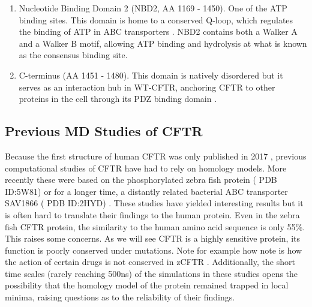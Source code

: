 \begin{enumerate}
	\item Nucleotide Binding Domain 2 (NBD2, AA 1169 - 1450). One of the ATP binding sites. This domain is home to a conserved Q-loop, which regulates the binding of ATP in ABC transporters \cite{ivey2020, zolnerciks2014, dong2015}. NBD2 contains both a Walker A and a Walker B motif, allowing ATP binding and hydrolysis at what is known as the consensus binding site. 
	\item C-terminus (AA 1451 - 1480). This domain is natively disordered but it serves as an interaction hub in WT-CFTR, anchoring CFTR to other proteins in the cell through its PDZ binding domain \cite{moyer1999, cushing2008}. 

\end{enumerate}



\subsection {Previous MD Studies of CFTR}
Because the first structure of human CFTR was only published in 2017 \cite{liu2017}, previous computational studies of CFTR have had to rely on homology models. More recently these were based on the phosphorylated zebra fish protein ( PDB ID:5W81) \cite{zhang2017a} or for a longer time, a distantly related bacterial ABC transporter SAV1866 ( PDB ID:2HYD) \cite{dawson2006, Hoffmann2018}. These studies have yielded interesting results but it is often hard to translate their findings to the human protein. Even in the zebra fish CFTR protein, the similarity to the human amino acid sequence is only 55\%. This raises some concerns. As we will see CFTR is a highly sensitive protein, its function is poorly conserved under mutations. Note for example how note is how the action of certain drugs is not conserved in zCFTR \cite{laselva2019}. Additionally, the short time scales (rarely reaching 500ns) of the simulations in these studies opens the possibility that the homology model of the protein remained trapped in local minima, raising questions as to the reliability of their findings.  

